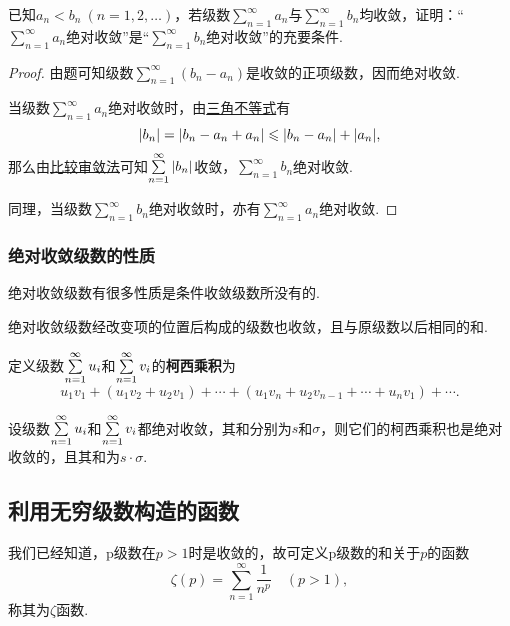 \begin{example}
已知\(a_n < b_n\ (n=1,2,\dotsc)\)，若级数\(\sum\limits_{n=1}^{\infty} a_n\)与\(\sum\limits_{n=1}^{\infty} b_n\)均收敛，证明：“\(\sum\limits_{n=1}^{\infty} a_n\)绝对收敛”是“\(\sum\limits_{n=1}^{\infty} b_n\)绝对收敛”的充要条件.
\begin{proof}
由题可知级数\(\sum\limits_{n=1}^{\infty} (b_n - a_n)\)是收敛的正项级数，因而绝对收敛.

当级数\(\sum\limits_{n=1}^{\infty} a_n\)绝对收敛时，由\hyperref[theorem:不等式.三角不等式]{三角不等式}有\[
\abs{b_n} = \abs{b_n - a_n + a_n}
\leqslant \abs{b_n - a_n} + \abs{a_n},
\]那么由\hyperref[theorem:无穷级数.正项级数的比较审敛法]{比较审敛法}可知\(\sum\limits_{n=1}^{\infty} \abs{b_n}\)收敛，\(\sum\limits_{n=1}^{\infty} b_n\)绝对收敛.

同理，当级数\(\sum\limits_{n=1}^{\infty} b_n\)绝对收敛时，亦有\(\sum\limits_{n=1}^{\infty} a_n\)绝对收敛.
\end{proof}
\end{example}

\subsubsection{绝对收敛级数的性质}
绝对收敛级数有很多性质是条件收敛级数所没有的.

\begin{property}[绝对收敛级数的可交换性]\label{theorem:无穷级数.绝对收敛级数的可交换性}
绝对收敛级数经改变项的位置后构成的级数也收敛，且与原级数以后相同的和.
\end{property}

\begin{definition}\label{definition:无穷级数.绝对收敛级数的柯西乘积必收敛}
定义级数\(\sum\limits_{n=1}^{\infty} u_i\)和\(\sum\limits_{n=1}^{\infty} v_i\)的\textbf{柯西乘积}为\[
u_1 v_1 + (u_1 v_2 + u_2 v_1) + \dotsb + (u_1 v_n + u_2 v_{n-1} + \dotsb + u_n v_1) + \dotsb.
\]
\end{definition}

\begin{theorem}
设级数\(\sum\limits_{n=1}^{\infty} u_i\)和\(\sum\limits_{n=1}^{\infty} v_i\)都绝对收敛，其和分别为\(s\)和\(\sigma\)，则它们的柯西乘积也是绝对收敛的，且其和为\(s \cdot \sigma\).
\end{theorem}

\subsection{利用无穷级数构造的函数}
\begin{definition}
我们已经知道，p级数在\(p>1\)时是收敛的，故可定义p级数的和关于\(p\)的函数\[
\zeta(p) = \sum\limits_{n=1}^{\infty} \frac{1}{n^p} \quad (p>1),
\]称其为\(\zeta\)函数.
\end{definition}

